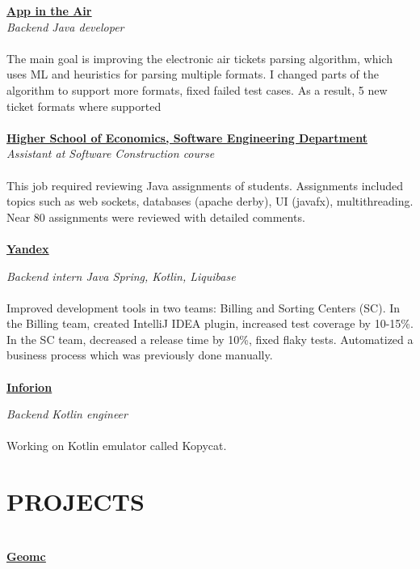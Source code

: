\documentclass{article}
\begin{document}
\noindent\href{https://www.appintheair.mobi/}{{\textbf{\underline{App in the Air}}}}
\\\noindent\textit{Backend Java developer}
\\\\
\noindent The main goal is improving the electronic air tickets parsing algorithm, which uses ML and heuristics
for parsing multiple formats. I changed parts of the algorithm to support more formats, fixed failed test
cases. As a result, 5 new ticket formats where supported
\\\\
\noindent\href{https://cs.hse.ru/en/dse/}{{\textbf{\underline{Higher School of Economics, Software Engineering Department}}}}
\\\textit{Assistant at Software Construction course}
\\\\
\noindent  This job required reviewing Java assignments of students. Assignments included topics such as web sockets,
databases (apache derby), UI (javafx), multithreading. Near 80 assignments were reviewed with detailed
comments.
\\\\
\noindent\href{https://yandex.com/}{{\textbf{\underline{Yandex}}}}

\noindent \textit{Backend intern Java Spring, Kotlin, Liquibase}
\\\\
\noindent Improved development tools in two teams: Billing and Sorting Centers (SC). In the Billing team, created
IntelliJ IDEA plugin, increased test coverage by 10-15\%. In the SC team, decreased a release time by
10\%, fixed flaky tests. Automatized a business process which was previously done manually.
\\\\
\noindent\href{https://inforion.ru/}{{\textbf{\underline{Inforion}}}}

\noindent \textit{Backend Kotlin engineer}
\\\\
\noindent Working on Kotlin emulator called Kopycat.


\section*{PROJECTS}
\makebox[530pt]{\rule{570pt}{0.4pt}}\\
\noindent\href{https://45.156.25.18/}{{\textbf{\underline{Geomc}}}}
\end{document}

